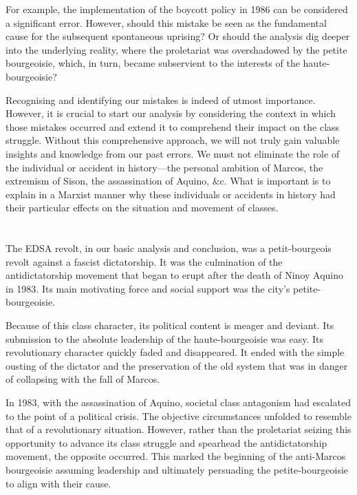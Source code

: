 For example, 
the implementation of the boycott policy in 1986 
can be considered a significant error. 
However, should this mistake be seen as the fundamental cause 
for the subsequent spontaneous uprising? 
Or should the analysis dig deeper into the underlying reality, 
where the proletariat was overshadowed by the petite bourgeoisie, 
which, in turn, 
became subservient to the interests of the haute-bourgeoisie?

Recognising and identifying our mistakes is indeed of utmost importance. 
However, it is crucial to start our analysis by considering 
the context in which those mistakes occurred 
and extend it to comprehend their impact on the class struggle. 
Without this comprehensive approach, 
we will not truly gain valuable insights and knowledge from our past errors.
We must not eliminate the role of the individual 
or accident in history---the 
personal ambition of Marcos, 
the extremism of Sison, 
the assassination of Aquino, \&c. 
What is important is to explain in a Marxist manner 
why these individuals or accidents in history 
had their particular effects on the situation and movement of classes.


\section{}
The EDSA revolt, 
in our basic analysis and conclusion, 
was a petit-bourgeois revolt against a fascist dictatorship. 
It was the culmination of the antidictatorship movement 
that began to erupt after the death of Ninoy Aquino in 1983. 
Its main motivating force and social support was the city's petite-bourgeoisie.

Because of this class character, 
its political content is meager and deviant. 
Its submission to the absolute leadership of the haute-bourgeoisie was easy. 
Its revolutionary character quickly faded and disappeared. 
It ended with the simple ousting of the dictator 
and the preservation of the old system that was in danger of collapsing 
with the fall of Marcos.

In 1983, with the assassination of Aquino, 
societal class antagonism had escalated 
to the point of a political crisis. 
The objective circumstances unfolded 
to resemble that of a revolutionary situation. 
However, rather than the proletariat seizing this opportunity 
to advance its class struggle 
and spearhead the antidictatorship movement, 
the opposite occurred. 
This marked the beginning of the anti-Marcos bourgeoisie 
assuming leadership and ultimately persuading 
the petite-bourgeoisie to align with their cause.

